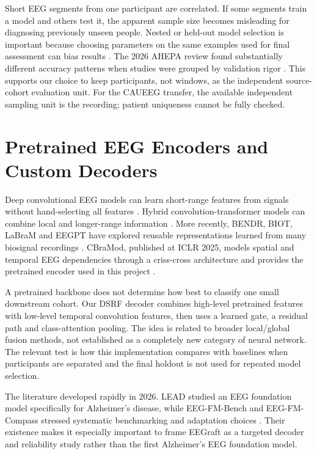 Short EEG segments from one participant are correlated. If some segments train a model and others test it, the apparent sample size becomes misleading for diagnosing previously unseen people. Nested or held-out model selection is important because choosing parameters on the same examples used for final assessment can bias results \cite{varma2006,varoquaux2018}. The 2026 AHEPA review found substantially different accuracy patterns when studies were grouped by validation rigor \cite{miltiadous2026benchmark}. This supports our choice to keep participants, not windows, as the independent source-cohort evaluation unit. For the CAUEEG transfer, the available independent sampling unit is the recording; patient uniqueness cannot be fully checked.

\section{Pretrained EEG Encoders and Custom Decoders}
Deep convolutional EEG models can learn short-range features from signals without hand-selecting all features \cite{schirrmeister2017,lawhern2018}. Hybrid convolution-transformer models can combine local and longer-range information \cite{song2023,dice2023}. More recently, BENDR, BIOT, LaBraM and EEGPT have explored reusable representations learned from many biosignal recordings \cite{kostas2021,yang2023biot,jiang2024labram,wang2024eegpt}. CBraMod, published at ICLR 2025, models spatial and temporal EEG dependencies through a criss-cross architecture and provides the pretrained encoder used in this project \cite{wang2025cbramod}.

A pretrained backbone does not determine how best to classify one small downstream cohort. Our DSRF decoder combines high-level pretrained features with low-level temporal convolution features, then uses a learned gate, a residual path and class-attention pooling. The idea is related to broader local/global fusion methods, not established as a completely new category of neural network. The relevant test is how this implementation compares with baselines when participants are separated and the final holdout is not used for repeated model selection.

The literature developed rapidly in 2026. LEAD studied an EEG foundation model specifically for Alzheimer's disease, while EEG-FM-Bench and EEG-FM-Compass stressed systematic benchmarking and adaptation choices \cite{wang2026lead,xiong2026,liu2026compass}. Their existence makes it especially important to frame EEGraft as a targeted decoder and reliability study rather than the first Alzheimer's EEG foundation model.


